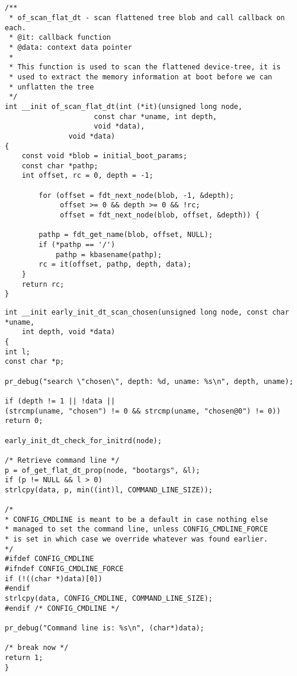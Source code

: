 \begin{lstlisting}
    

/**
 * of_scan_flat_dt - scan flattened tree blob and call callback on each.
 * @it: callback function
 * @data: context data pointer
 *
 * This function is used to scan the flattened device-tree, it is
 * used to extract the memory information at boot before we can
 * unflatten the tree
 */
int __init of_scan_flat_dt(int (*it)(unsigned long node,
				     const char *uname, int depth,
				     void *data),
			   void *data)
{
	const void *blob = initial_boot_params;
	const char *pathp;
	int offset, rc = 0, depth = -1;

        for (offset = fdt_next_node(blob, -1, &depth);
             offset >= 0 && depth >= 0 && !rc;
             offset = fdt_next_node(blob, offset, &depth)) {

		pathp = fdt_get_name(blob, offset, NULL);
		if (*pathp == '/')
			pathp = kbasename(pathp);
		rc = it(offset, pathp, depth, data);
	}
	return rc;
}
\end{lstlisting}


\begin{lstlisting}
int __init early_init_dt_scan_chosen(unsigned long node, const char *uname,
    int depth, void *data)
{
int l;
const char *p;

pr_debug("search \"chosen\", depth: %d, uname: %s\n", depth, uname);

if (depth != 1 || !data ||
(strcmp(uname, "chosen") != 0 && strcmp(uname, "chosen@0") != 0))
return 0;

early_init_dt_check_for_initrd(node);

/* Retrieve command line */
p = of_get_flat_dt_prop(node, "bootargs", &l);
if (p != NULL && l > 0)
strlcpy(data, p, min((int)l, COMMAND_LINE_SIZE));

/*
* CONFIG_CMDLINE is meant to be a default in case nothing else
* managed to set the command line, unless CONFIG_CMDLINE_FORCE
* is set in which case we override whatever was found earlier.
*/
#ifdef CONFIG_CMDLINE
#ifndef CONFIG_CMDLINE_FORCE
if (!((char *)data)[0])
#endif
strlcpy(data, CONFIG_CMDLINE, COMMAND_LINE_SIZE);
#endif /* CONFIG_CMDLINE */

pr_debug("Command line is: %s\n", (char*)data);

/* break now */
return 1;
}


\end{lstlisting}





